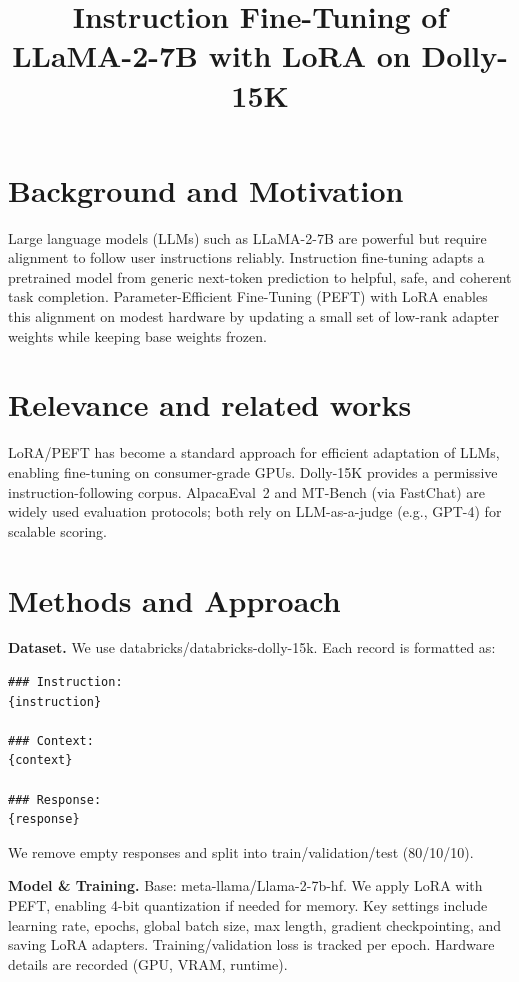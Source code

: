 \documentclass{assignment7_report}
\title{Instruction Fine-Tuning of LLaMA-2-7B with LoRA on Dolly-15K}
\author{\coord{Nauman}{(Author)}{1}}
\begin{document}
\maketitle

\section{Background and Motivation}
\vspace*{-3mm}

Large language models (LLMs) such as LLaMA-2-7B are powerful but require alignment to follow user instructions reliably. Instruction fine-tuning adapts a pretrained model from generic next-token prediction to helpful, safe, and coherent task completion. Parameter-Efficient Fine-Tuning (PEFT) with LoRA enables this alignment on modest hardware by updating a small set of low-rank adapter weights while keeping base weights frozen. 

\section{Relevance and related works}
\vspace*{-3mm}

LoRA/PEFT has become a standard approach for efficient adaptation of LLMs, enabling fine-tuning on consumer-grade GPUs. Dolly-15K provides a permissive instruction-following corpus. AlpacaEval~2 and MT-Bench (via FastChat) are widely used evaluation protocols; both rely on LLM-as-a-judge (e.g., GPT-4) for scalable scoring.


\section{Methods and Approach}
\vspace*{-3mm}

\textbf{Dataset.} We use databricks/databricks-dolly-15k. Each record is formatted as:
\begin{verbatim}
### Instruction:
{instruction}

### Context:
{context}

### Response:
{response}
\end{verbatim}
We remove empty responses and split into train/validation/test (80/10/10).

\textbf{Model \& Training.} Base: meta-llama/Llama-2-7b-hf. We apply LoRA with PEFT, enabling 4-bit quantization if needed for memory. Key settings include learning rate, epochs, global batch size, max length, gradient checkpointing, and saving LoRA adapters. Training/validation loss is tracked per epoch. Hardware details are recorded (GPU, VRAM, runtime).
\end{document}
